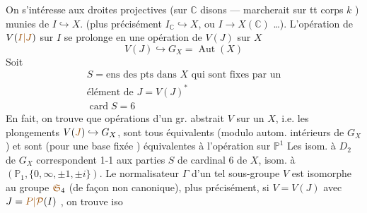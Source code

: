 On s'intéresse aux droites projectives (sur $\mathbb C$ disons --- 
marcherait sur tt corps $k$ ) munies de $I\hookrightarrow X$.
(plus précisément $I_{\mathbb C}\hookrightarrow X$, ou $I\longrightarrow X(\mathbb C)$ \ldots).
L'opération de $V(\unsure{I|J})$ sur $I$ se prolonge en une opération de
$V(J)$ sur $X$
\[
V(J)\hookrightarrow G_X=\operatorname{Aut}(X)
\]
Soit
\[
\begin{gathered}
S=\text{ens des pts dans }X\text{ qui sont fixes par un}\\
\text{élément de }J=V(J)^*\\
\operatorname{card}S=6
\end{gathered}
\]
En fait, on trouve que  opérations  d'un gr. abstrait $V$
sur un $X$, i.e. les plongements $V(\unsure{J})\hookrightarrow G_X$, sont tous
équivalents (modulo autom. intérieurs de $G_X$)
et sont (pour une base fixée ) équivalentes à l'opération sur $\mathbb P^1$
Les  isom. à $D_2$ de $G_X$ correspondent 1-1 aux
parties $S$ de cardinal 6 de $X$, isom. à $(\mathbb P_1,\{0,\infty,\pm1,\pm i\})$.
Le normalisateur $\Gamma$ d'un tel  sous-groupe $V$  est isomorphe
au groupe  $\unsure{\mathfrak S}_4$ (de façon non canonique), plus
précisément, si $V=V(J)$ avec $J=\unsure{P|\mathcal P}(I)$ , on trouve  iso
